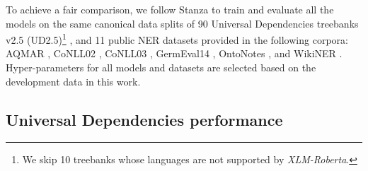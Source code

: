 \documentclass[11pt,a4paper]{article}
\begin{document}
To achieve a fair comparison, we follow Stanza \cite{qi-etal-2020-stanza} to train and evaluate all the models on the same canonical data splits of 90 Universal Dependencies treebanks v2.5 (UD2.5)\footnote{We skip 10 treebanks whose languages are not supported by \textit{XLM-Roberta}.} \citep{11234/1-3105}, and 11 public NER datasets provided in the following corpora: AQMAR \citep{mohit-etal-2012-recall}, CoNLL02 \citep{tjong-kim-sang-2002-introduction}, CoNLL03 \citep{tjong-kim-sang-de-meulder-2003-introduction}, GermEval14 \citep{benikova-etal-2014-nosta}, OntoNotes \citep{weischedel2013ontonotes}, and WikiNER \citep{nothman2012:artint:wikiner}. Hyper-parameters for all models and datasets are selected based on the development data in this work.














\begin{table*}[ht]
\centering
\addtolength{\belowcaptionskip}{-3mm}
\caption{Model performance on 9 different treebanks (macro-averaged F1 score over test sets).}
\label{tab:ablation}
\end{table*}

\subsection{Universal Dependencies performance}
\end{document}
